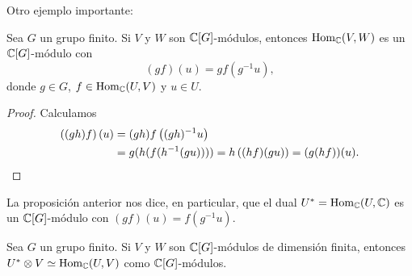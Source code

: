 Otro ejemplo importante:

\begin{proposition}
	Sea $G$ un grupo finito. Si $V$ y $W$ son $\mathbb{C}[G]$-módulos, entonces
	$\operatorname{Hom}_{\mathbb{C}}(V,W)$ es un $\mathbb{C}[G]$-módulo con 
	\[
	(gf)(u)=gf(g^{-1}u),
	\]
	donde $g\in G$,
	$f\in\operatorname{Hom}_{\mathbb{C}}(U,V)$ y $u\in U$.
\end{proposition}

\begin{proof}
	Calculamos
	\begin{align*}
		\left( (gh)f \right)(u)&=(gh)f\left( (gh)^{-1}u \right)\\
		&=g(h(f(h^{-1}(gu))))=h\left( (hf)(gu) \right)=(g(hf))(u).\qedhere
	\end{align*}
\end{proof}

La proposición anterior nos dice, en particular, que el dual
$U^*=\operatorname{Hom}_{\mathbb{C}}(U,\mathbb{C})$ es un $\mathbb{C}[G]$-módulo con $(gf)(u)=f(g^{-1}u)$. 

\begin{exercise}
	Sea $G$ un grupo finito. Si $V$ y $W$ son $\mathbb{C}[G]$-módulos de dimensión finita, entonces
	$U^*\otimes V\simeq\operatorname{Hom}_{\mathbb{C}}(U,V)$ 
	como $\mathbb{C}[G]$-módulos.
\end{exercise}